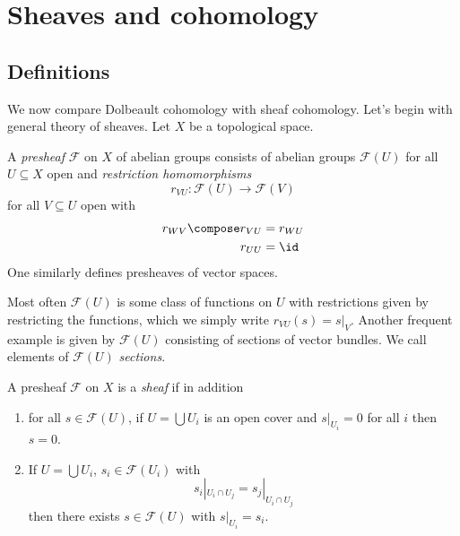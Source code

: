 \documentclass[a4paper]{article}
\begin{document}
\section{Sheaves and cohomology}

\subsection{Definitions}

We now compare Dolbeault cohomology with sheaf cohomology. Let's begin with general theory of sheaves. Let \(X\) be a topological space.

\begin{definition}[presheaf]
  A \emph{presheaf} \(\mathcal F\) on \(X\) of abelian groups consists of abelian groups \(\mathcal F(U)\) for all \(U \subseteq X\) open and \emph{restriction homomorphisms}
  \[
    r_{VU}: \mathcal F(U) \to \mathcal F(V)
  \]
  for all \(V \subseteq U\) open with
  \begin{align*}
    r_{WV} \compose r_{VU} &= r_{WU} \\
    r_{UU} &= \id
  \end{align*}
  One similarly defines presheaves of vector spaces.
\end{definition}

Most often \(\mathcal F(U)\) is some class of functions on \(U\) with restrictions given by restricting the functions, which we simply write \(r_{VU}(s) = s|_V\). Another frequent example is given by \(\mathcal F(U)\) consisting of sections of vector bundles. We call elements of \(\mathcal F(U)\) \emph{sections}.

\begin{definition}[sheaf]
  A presheaf \(\mathcal F\) on \(X\) is a \emph{sheaf} if in addition
  \begin{enumerate}
  \item for all \(s \in \mathcal F(U)\), if \(U = \bigcup U_i\) is an open cover and \(s|_{U_i} = 0\) for all \(i\) then \(s = 0\).
  \item If \(U = \bigcup U_i\), \(s_i \in \mathcal F(U_i)\) with
    \[
      s_i|_{U_i \cap U_j} = s_j|_{U_i \cap U_j}
    \]
    then there exists \(s \in \mathcal F(U)\) with \(s|_{U_i} = s_i\).
  \end{enumerate}
\end{definition}
\end{document}
